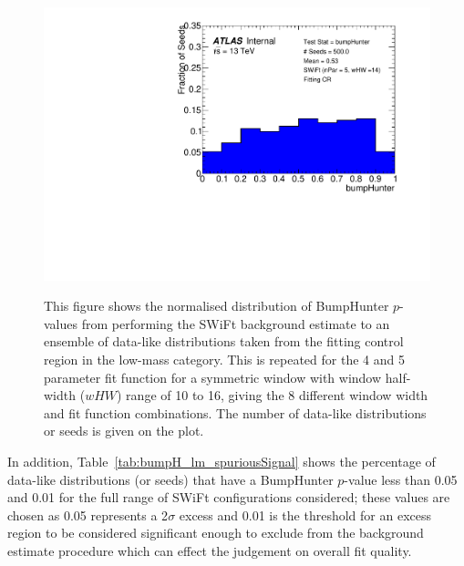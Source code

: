 \begin{figure}[!htb]
{}                                                                                              
 {                                                    
  \includegraphics[width=0.45\linewidth, angle=0]{figs/Dibjet/LowMass/FitStudy_min566/pVal_bumpHunter_corrFitCR_5para_low14_high14.pdf}
}                                                                                              
\vspace{10pt}
\caption{\label{fig:bumpH_spuriousSignal}
  This figure shows the normalised distribution of {\sc BumpHunter} \mbox{$p$-value}s from performing the SWiFt background estimate to an ensemble of
  data-like distributions taken from the fitting control region in the low-mass category.
  This is repeated for the 4 and 5 parameter fit function for a symmetric window with window half-width ($wHW$) range of 10 to 16,
  giving the 8 different window width and fit function combinations.
  The number of data-like distributions or seeds is given on the plot.
}
\end{figure}


In addition, Table~\ref{tab:bumpH_lm_spuriousSignal} shows the percentage of data-like distributions (or seeds)
that have a {\sc BumpHunter} \mbox{$p$-value} less than %
0.05 and 0.01 for the full range of SWiFt configurations considered;
these values are chosen as 0.05 represents a 2$\sigma$ excess and
0.01 is the threshold for an excess region to be considered significant enough
to exclude from the background estimate procedure which can effect the judgement on overall fit quality.

